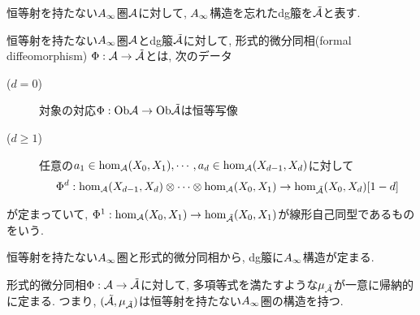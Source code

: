 \documentclass[uplatex, a4paper, 14Q, dvipdfmx]{jsarticle}
\begin{document}
\begin{notation}
  恒等射を持たない$A_{\infty}$圏$\mathcal{A}$に対して, $A_{\infty}$構造を忘れたdg箙を$\tilde{\mathcal{A}}$と表す. 
\end{notation}

\begin{definition}[形式的微分同相] \label{def_formal_diffeomorphism}
  恒等射を持たない$A_{\infty}$圏$\mathcal{A}$とdg箙$\tilde{\mathcal{A}}$に対して, 形式的微分同相(formal diffeomorphism) $\Phi : \mathcal{A} \to \tilde{\mathcal{A}}$とは, 次のデータ 
  \begin{description}
    \item[($d=0$)] 対象の対応$\Phi : \mathrm{Ob}\mathcal{A} \to \mathrm{Ob}\tilde{\mathcal{A}}$は恒等写像
    \item[($d \geq 1$)] 任意の$a_1 \in \hom_{\mathcal{A}}(X_0,X_1), \cdots, a_d \in \hom_{\mathcal{A}}(X_{d-1},X_d)$に対して
    \begin{align*}
      \Phi^d : \hom_{\mathcal{A}}(X_{d-1},X_d) \otimes \cdots \otimes \hom_{\mathcal{A}}(X_0,X_1) \to \hom_{\tilde{\mathcal{A}}}(X_0,X_d)[1-d]
    \end{align*}
  \end{description}
  が定まっていて, $\Phi^1 : \hom_{\mathcal{A}}(X_0,X_1) \to \hom_{\tilde{\mathcal{A}}}(X_0,X_1)$が線形自己同型であるものをいう.
\end{definition}

恒等射を持たない$A_{\infty}$圏と形式的微分同相から, dg箙に$A_{\infty}$構造が定まる. 

\begin{theorem} \label{prop_modified_Ainf_structure}
  形式的微分同相$\Phi : \mathcal{A} \to \tilde{\mathcal{A}}$に対して, 多項等式を満たすような$\mu_{\tilde{\mathcal{A}}}$が一意に帰納的に定まる.
  つまり, $(\tilde{\mathcal{A}}, \mu_{\tilde{\mathcal{A}}})$は恒等射を持たない$A_{\infty}$圏の構造を持つ.  
\end{theorem}
\end{document}

